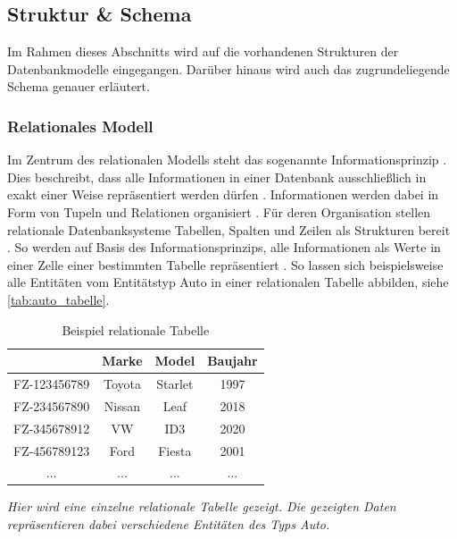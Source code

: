 \subsection{Struktur \& Schema}
\label{datenmodelle:structure}
Im Rahmen dieses Abschnitts wird auf die vorhandenen Strukturen der Datenbankmodelle eingegangen. Darüber hinaus wird auch das zugrundeliegende Schema genauer erläutert. 

\subsubsection{Relationales Modell}
\label{datenmodelle:structure:relational}
Im Zentrum des relationalen Modells steht das sogenannte Informationsprinzip \cite{rdbms_history}. Dies beschreibt, dass alle Informationen in einer Datenbank ausschließlich in exakt einer Weise repräsentiert werden dürfen \cite{codd_relational_model}. Informationen werden dabei in Form von Tupeln und Relationen organisiert \cite{codd_relational_model}. Für deren Organisation stellen relationale Datenbanksysteme Tabellen, Spalten und Zeilen als Strukturen bereit \cite{rdbms_history}. So werden auf Basis des Informationsprinzips, alle Informationen als Werte in einer Zelle einer bestimmten Tabelle repräsentiert \cite{rdbms_history}. So lassen sich beispielsweise alle Entitäten vom Entitätstyp Auto in einer relationalen Tabelle abbilden, siehe \autoref{tab:auto_tabelle}. 

\begin{table}[ht]
    \centering
    \begin{tabular}{c|c|c|c}
    \hline
    \rowcolor[HTML]{EFEFEF} 
    \multicolumn{1}{l|}{\cellcolor[HTML]{EFEFEF}\textbf{Fahrzeugnummer}} & \multicolumn{1}{l|}{\cellcolor[HTML]{EFEFEF}\textbf{Marke}} & \multicolumn{1}{l|}{\cellcolor[HTML]{EFEFEF}\textbf{Model}} & \multicolumn{1}{l}{\cellcolor[HTML]{EFEFEF}\textbf{Baujahr}} \\ \hline
    FZ-123456789 & Toyota & Starlet & 1997 \\
    FZ-234567890 & Nissan & Leaf & 2018 \\
    FZ-345678912 & VW & ID3 & 2020 \\
    FZ-456789123 & Ford & Fiesta & 2001 \\
    ... & ... & ... & ... \\ \hline
    \end{tabular}
    \caption{Beispiel relationale Tabelle}
    \vspace{0.1em}
    \textit{Hier wird eine einzelne relationale Tabelle gezeigt. Die gezeigten Daten repräsentieren dabei verschiedene Entitäten des Typs Auto.}
    \label{tab:auto_tabelle}
\end{table}

